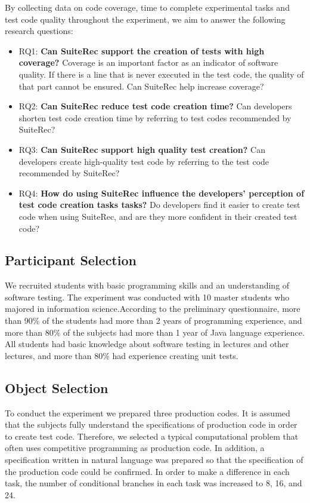 \documentclass[conference]{IEEEtran}
\begin{document}
By collecting data on code coverage, time to complete experimental tasks and test code quality throughout the experiment, we aim to answer the following research questions:


\begin{itemize}
\item RQ1: \textbf{Can SuiteRec support the creation of tests with high coverage?} Coverage is an important factor as an indicator of software quality. If there is a line that is never executed in the test code, the quality of that part cannot be ensured. Can SuiteRec help increase coverage?
\item RQ2: \textbf{Can SuiteRec reduce test code creation time?} Can developers shorten test code creation time by referring to test codes recommended by SuiteRec?
\item RQ3: \textbf{Can SuiteRec support high quality test creation?} Can developers create high-quality test code by referring to the test code recommended by SuiteRec?
\item RQ4: \textbf{How do using SuiteRec influence the developers’ perception of test code creation tasks tasks? } Do developers find it easier to create test code when using SuiteRec, and are they more confident in their created test code?
\end{itemize}

\subsection{Participant Selection}
We recruited students with basic programming skills and an understanding of software testing. The experiment was conducted with 10 master students who majored in information science.According to the preliminary questionnaire, more than 90\% of the students had more than 2 years of programming experience, and more than 80\% of the subjects had more than 1 year of Java language experience. All students had basic knowledge about software testing in lectures and other lectures, and more than 80\% had experience creating unit tests.

\subsection{Object Selection}
To conduct the experiment we prepared three production codes. It is assumed that the subjects fully understand the specifications of production code in order to create test code. Therefore, we selected a typical computational problem that often uses competitive programming as production code. In addition, a specification written in natural language was prepared so that the specification of the production code could be confirmed. In order to make a difference in each task, the number of conditional branches in each task was increased to 8, 16, and 24.
\end{document}
